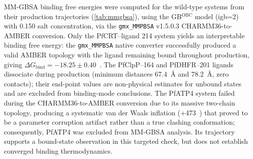 \documentclass[11pt,a4paper]{article}
\begin{document}
MM-GBSA binding free energies were computed for the wild-type systems from their production trajectories (\cref{tab:mmgbsa}), using the GB$^{\text{OBC}}$ model (igb=2) with \SI{0.150}{\molar} salt concentration, via the \texttt{gmx\_MMPBSA} v1.5.0.3 CHARMM36-to-AMBER conversion. Only the PfCRT--ligand 214 system yields an interpretable binding free energy: the \texttt{gmx\_MMPBSA} native converter successfully produced a valid AMBER topology with the ligand remaining bound throughout production, giving $\Delta G_{\mathrm{bind}} = -18.25 \pm \num{0.40}$~\si{\kcalmol}. The PfClpP--164 and PfDHFR--201 ligands dissociate during production (minimum distances \SI{67.4}{\angstrom} and \SI{78.2}{\angstrom}, zero contacts); their end-point values are non-physical estimates for unbound states and are excluded from binding-mode conclusions. The PfATP4 system failed during the CHARMM36-to-AMBER conversion due to its massive two-chain topology, producing a systematic van der Waals inflation (+473~\si{\kcalmol}) that proved to be a parameter corruption artifact rather than a true clashing conformation; consequently, PfATP4 was excluded from MM-GBSA analysis. Its trajectory supports a bound-state observation in this targeted check, but does not establish converged binding thermodynamics.
\end{document}
